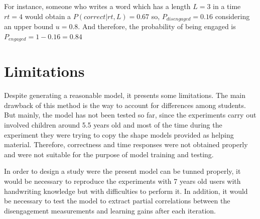 For instance, someone who writes a word which has a length $ L=3 $ in a time $ rt=4 $ would obtain a $ P(correct|rt,L)= 0.67 $ so, $ P_{disengaged}=0.16 $ considering an upper bound $ u=0.8 $. And therefore, the probability of being engaged is $ P_{engaged}=1-0.16=0.84 $

\section{Limitations}
Despite generating a reasonable model, it presents some limitations. The main drawback of this method is the way to account for differences among students. But mainly, the model has not been tested so far, since the experiments carry out involved children around 5.5 years old and most of the time during the experiment they were trying to copy the shape models provided as helping material. Therefore, correctness and time responses were not obtained properly and were not suitable for the purpose of model training and testing.

In order to design a study were the present model can be tunned properly, it would be necessary to reproduce the experiments with 7 years old users with handwriting knowledge but with difficulties to perform it. In addition, it would be necessary to test the model to extract partial correlations between the disengagement measurements and learning gains after each iteration.  

